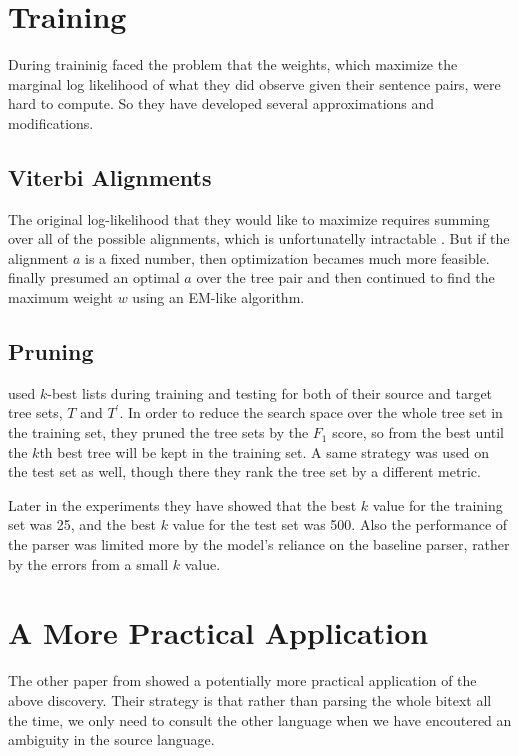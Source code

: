 \documentclass[11pt]{article} %
\begin{document}
\section{Training}

During traininig \cite{Burkett:2008:TLB:1613715.1613828} faced the problem that the weights, which maximize the marginal log likelihood of what they did observe given their sentence pairs, were hard to compute. So they have developed several approximations and modifications.

\subsection{Viterbi Alignments}

The original log-likelihood that they would like to maximize requires summing over all of the possible alignments, which is unfortunatelly intractable \citep{Valiant1979TheCO}. But if the alignment $a$ is a fixed number, then optimization becames much more feasible. \cite{Burkett:2008:TLB:1613715.1613828} finally presumed an optimal $a$ over the tree pair and then continued to find the maximum weight $w$ using an EM-like algorithm.

\subsection{Pruning}

\cite{Burkett:2008:TLB:1613715.1613828} used $k$-best lists during training and testing for both of their source and target tree sets, $T$ and $T^\prime$. In order to reduce the search space over the whole tree set in the training set, they pruned the tree sets by the $F_1$ score, so from the best until the $k$th best tree will be kept in the training set. A same strategy was used on the test set as well, though there they rank the tree set by a different metric.

Later in the experiments they have showed that the best $k$ value for the training set was 25, and the best $k$ value for the test set was 500. Also the performance of the parser was limited more by the model's reliance on the baseline parser, rather by the errors from a small $k$ value.

\section{A More Practical Application}

The other paper from \cite{Huang:2009:BSP:1699648.1699668} showed a potentially more practical application of the above discovery. Their strategy is that rather than parsing the whole bitext all the time, we only need to consult the other language when we have encoutered an ambiguity in the source language.
\end{document}
